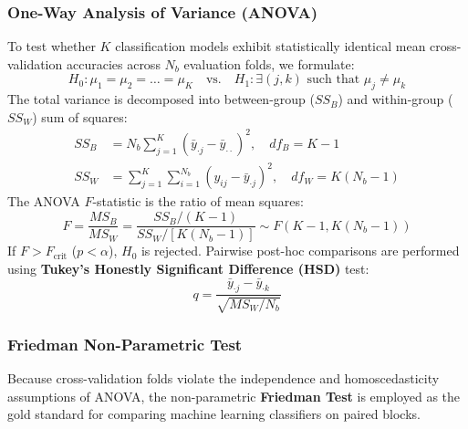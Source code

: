 \documentclass[12pt,a4paper]{article}
\begin{document}
\subsubsection{One-Way Analysis of Variance (ANOVA)}
To test whether $K$ classification models exhibit statistically identical mean cross-validation accuracies across $N_b$ evaluation folds, we formulate:
\begin{equation}
H_0: \mu_1 = \mu_2 = \dots = \mu_K \quad \text{vs.} \quad H_1: \exists (j, k) \text{ such that } \mu_j \ne \mu_k
\end{equation}
The total variance is decomposed into between-group ($SS_B$) and within-group ($SS_W$) sum of squares:
\begin{align}
SS_B &= N_b \sum_{j=1}^K (\bar{y}_{\cdot j} - \bar{y}_{\cdot \cdot})^2, \quad df_B = K - 1 \\
SS_W &= \sum_{j=1}^K \sum_{i=1}^{N_b} (y_{ij} - \bar{y}_{\cdot j})^2, \quad df_W = K(N_b - 1)
\end{align}
The ANOVA $F$-statistic is the ratio of mean squares:
\begin{equation}
F = \frac{MS_B}{MS_W} = \frac{SS_B / (K - 1)}{SS_W / [K(N_b - 1)]} \sim F(K - 1, K(N_b - 1))
\end{equation}
If $F > F_{\text{crit}}$ ($p < \alpha$), $H_0$ is rejected. Pairwise post-hoc comparisons are performed using \textbf{Tukey's Honestly Significant Difference (HSD)} test:
\begin{equation}
q = \frac{\bar{y}_{\cdot j} - \bar{y}_{\cdot k}}{\sqrt{MS_W / N_b}}
\end{equation}

\subsubsection{Friedman Non-Parametric Test}
Because cross-validation folds violate the independence and homoscedasticity assumptions of ANOVA, the non-parametric \textbf{Friedman Test} is employed as the gold standard for comparing machine learning classifiers on paired blocks.
\end{document}
